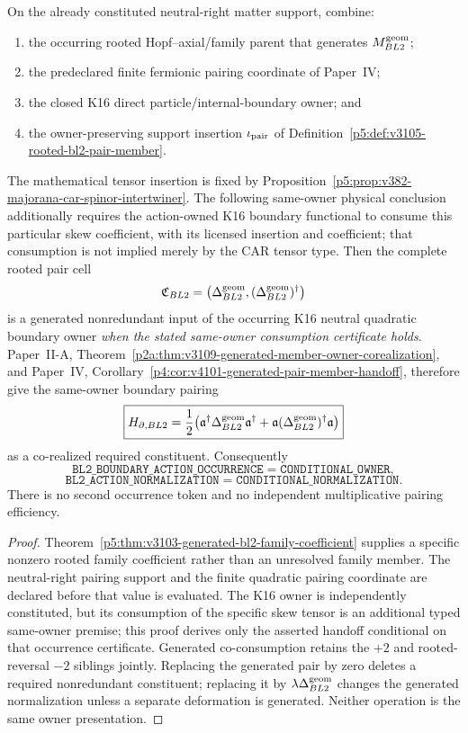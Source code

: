\documentclass[12pt,a4paper]{article}
\begin{document}
\begin{theorem}
\label{p5:thm:v3105-k16-bl2-pair-corealization}
On the already constituted neutral-right matter support, combine:
\begin{enumerate}[label=(\roman*),leftmargin=2em]
\item the occurring rooted Hopf--axial/family parent that generates
$M_{BL2}^{\rm geom}$;
\item the predeclared finite fermionic pairing coordinate of Paper~IV;
\item the closed K16 direct particle/internal-boundary owner; and
\item the owner-preserving support insertion
$\iota_{\rm pair}$ of Definition~\ref{p5:def:v3105-rooted-bl2-pair-member}.
\end{enumerate}
The mathematical tensor insertion is fixed by Proposition~\ref{p5:prop:v382-majorana-car-spinor-intertwiner}. The following same-owner physical conclusion additionally requires the action-owned K16 boundary functional to consume this particular skew coefficient, with its licensed insertion and coefficient; that consumption is not implied merely by the CAR tensor type.
Then the complete rooted pair cell
\[
 \mathfrak C_{BL2}
 =\bigl(\Delta_{BL2}^{\rm geom},
        (\Delta_{BL2}^{\rm geom})^\dagger\bigr)
\]
is a generated nonredundant input of the occurring K16 neutral quadratic
boundary owner \emph{when the stated same-owner consumption certificate holds}.  Paper~II-A,
Theorem~\ref{p2a:thm:v3109-generated-member-owner-corealization}, and
Paper~IV, Corollary~\ref{p4:cor:v4101-generated-pair-member-handoff}, therefore
give the same-owner boundary pairing
\[
 \boxed{
 H_{\partial,BL2}
 =\frac12\bigl(
  \mathfrak a^\dagger\Delta_{BL2}^{\rm geom}\mathfrak a^\dagger
 +\mathfrak a(\Delta_{BL2}^{\rm geom})^\dagger\mathfrak a
 \bigr)}
\]
as a co-realized required constituent.  Consequently
\[
 \boxed{
 \texttt{BL2\_BOUNDARY\_ACTION\_OCCURRENCE}
 =\texttt{CONDITIONAL\_OWNER},}
\]
\[
 \boxed{
 \texttt{BL2\_ACTION\_NORMALIZATION}
 =\texttt{CONDITIONAL\_NORMALIZATION}.}
\]
There is no second occurrence token and no independent multiplicative
pairing efficiency.
\end{theorem}

\begin{proof}
Theorem~\ref{p5:thm:v3103-generated-bl2-family-coefficient} supplies a
specific nonzero rooted family coefficient rather than an unresolved family
member.  The neutral-right pairing support and the finite quadratic pairing
coordinate are declared before that value is evaluated.  The K16 owner is independently constituted, but its consumption of the specific
skew tensor is an additional typed same-owner premise; this proof derives
only the asserted handoff conditional on that occurrence certificate.  Generated co-consumption retains the $+2$ and rooted-reversal
$-2$ siblings jointly.  Replacing the generated pair by zero deletes a
required nonredundant constituent; replacing it by
$\lambda\Delta_{BL2}^{\rm geom}$ changes the generated normalization unless a
separate deformation is generated.  Neither operation is the same owner
presentation.
\end{proof}
\end{document}
